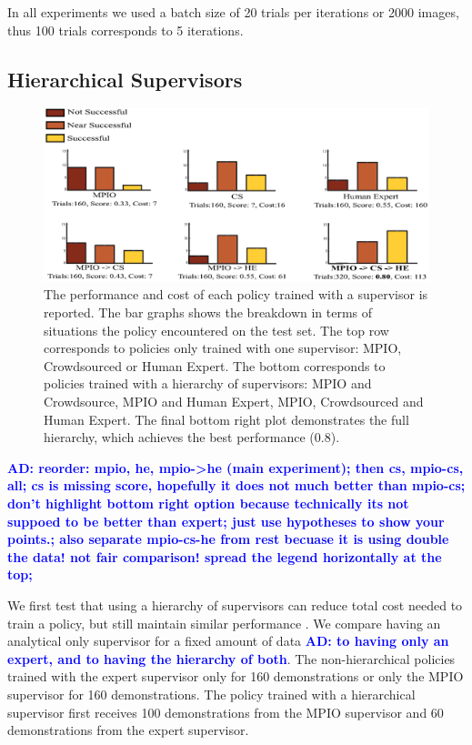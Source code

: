 \documentclass[10pt, conference]{ieeeconf}      %
\newcommand{\adnote}[1]{\ifthenelse{ \boolean{include-notes}}%
 {\textcolor{blue}{\textbf{AD: #1}}}{}}
\begin{document}
In all experiments we used a batch size of 20 trials per iterations or 2000 images, thus 100 trials corresponds to 5 iterations. 

\subsection{Hierarchical Supervisors}

\begin{figure}[t]
\centering
\includegraphics{f_figs/results.eps}

\caption{ \footnotesize The performance and cost of each policy trained with a supervisor is reported. The bar graphs shows the breakdown in terms of situations the policy encountered on the test set. The top row corresponds to policies only trained with one supervisor: MPIO, Crowdsourced or Human Expert. The bottom corresponds to policies trained with a hierarchy of supervisors: MPIO and Crowdsource, MPIO and Human Expert, MPIO, Crowdsourced and Human Expert. The final bottom right plot demonstrates the full hierarchy, which achieves the best performance (0.8).   }
\vspace*{-20pt}
\label{fig:perf_results}
\end{figure}
\adnote{reorder: mpio, he, mpio->he (main experiment); then cs, mpio-cs, all; cs is missing score, hopefully it does not much better than mpio-cs; don't highlight bottom right option because technically its not suppoed to be better than expert; just use hypotheses to show your points.; also separate mpio-cs-he from rest becuase it is using double the data! not fair comparison! spread the legend horizontally at the top; }


We first test  that using a hierarchy of supervisors can reduce total cost needed to train a policy, but still maintain similar performance .  We compare having an analytical only supervisor for a fixed amount of data \adnote{to having only an expert, and to having the hierarchy of both}. The non-hierarchical policies trained with the expert supervisor only for 160 demonstrations or only the MPIO supervisor for 160 demonstrations.  The policy trained with a hierarchical supervisor first receives  100 demonstrations from the MPIO supervisor and  60 demonstrations from the expert supervisor. 
\end{document}
